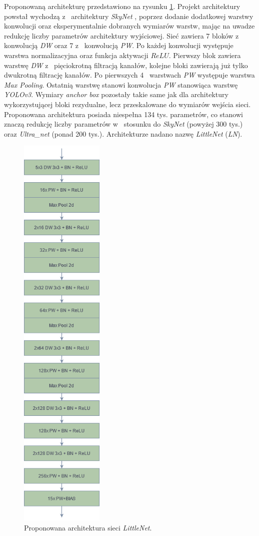 Proponowaną architekturę przedstawiono na rysunku \ref{fig:LN_arch}. 
Projekt architektury powstał wychodzą z~ architektury \emph{SkyNet} \cite{skynet}, 
poprzez dodanie dodatkowej warstwy konwolucji oraz eksperymentalnie dobranych wymiarów warstw, mając na uwadze redukcję liczby parametrów architektury wyjściowej. 
Sieć zawiera 7 bloków z~ konwolucją \emph{DW} oraz 7 z~ konwolucją \emph{PW}. 
Po każdej konwolucji występuje warstwa normalizacyjna oraz funkcja aktywacji $ReLU$. 
Pierwszy blok zawiera warstwę \emph{DW} z~ pięciokrotną filtracją kanałów, kolejne bloki zawierają już tylko dwukrotną filtrację kanałów.
Po pierwszych 4~ warstwach \emph{PW} występuje warstwa \emph{Max Pooling}. 
Ostatnią warstwę stanowi konwolucja \emph{PW} stanowiąca warstwę \emph{YOLOv3}. 
Wymiary \emph{anchor box} pozostały takie same jak dla architektury wykorzystującej bloki rezydualne, lecz przeskalowane do wymiarów wejścia sieci. 
Proponowana architektura posiada niespełna 134 tys. parametrów, co stanowi znaczą redukcję liczby parametrów w~ stosunku do \emph{SkyNet} (powyżej 300 tys.) oraz \emph{Ultra\_net} (ponad 200 tys.). 
Architekturze nadano %
nazwę \emph{LittleNet} (\emph{LN}).
\begin{figure}
    \centering
    \includegraphics[width=4cm]{images/LNv1}
    \caption{Proponowana architektura sieci \emph{LittleNet}.}
    \label{fig:LN_arch}
\end{figure}

